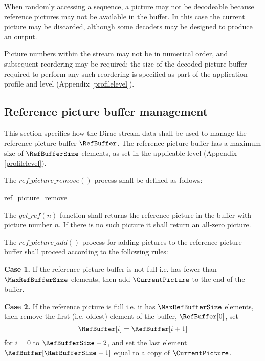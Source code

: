  
\begin{informative}
When randomly accessing a sequence, a picture may not be decodeable 
because reference pictures may not be available in the buffer. In this case the 
current picture may be discarded, although some decoders may be designed to 
produce an output. 

Picture numbers within the stream may not be in numerical order, and 
subsequent reordering may be required: the size of the decoded picture buffer 
required to perform any such reordering is specified as part of the application profile 
and level (Appendix \ref{profilelevel}).
\end{informative}

\subsection{Reference picture buffer management}
\label{refbuffer}

This section specifies how the Dirac stream data shall be used to manage the reference 
picture buffer $\RefBuffer$. The reference picture buffer has a maximum size of
$\RefBufferSize$ elements, as set in the applicable level (Appendix \ref{profilelevel}).

The $ref\_picture\_remove()$ process shall be defined as
follows:

\begin{pseudo}{ref\_picture\_remove}{}
            \bsCODE{\RefBuffer[j]=\RefBuffer[j+1]}
        \bsEND
    \bsEND
\bsEND
\end{pseudo}

The $get\_ref(n)$ function shall returns the reference picture in the buffer with 
picture number $n$.  If there is no such picture it shall return an all-zero picture.

The $ref\_picture\_add()$ process for adding pictures to the reference picture
buffer shall proceed according to the following rules:

{\bf Case 1.} If the reference picture buffer is not full i.e. has fewer than $\MaxRefBufferSize$ elements,
then add $\CurrentPicture$ to the end of the buffer. 

{\bf Case 2.} If the reference picture is full i.e. it has $\MaxRefBufferSize$ elements, then remove the
first (i.e. oldest) element of the buffer, $\RefBuffer[0]$, set
\[\RefBuffer[i] = \RefBuffer[i+1] \]
for $i=0$ to $\RefBufferSize-2$, and set the last element $\RefBuffer[\RefBufferSize-1]$ equal to
a copy of $\CurrentPicture$.

